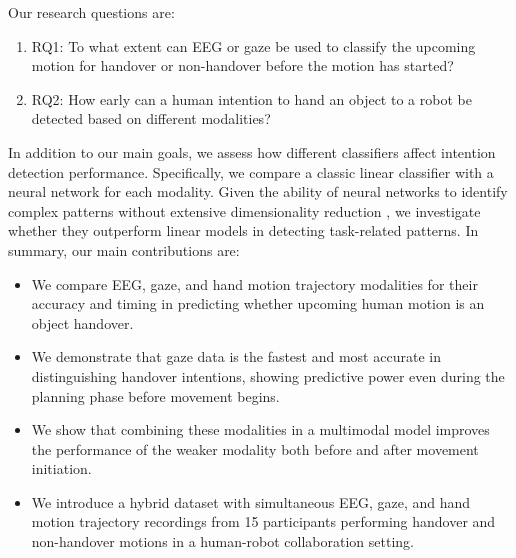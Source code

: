 Our research questions are:
\begin{enumerate}
    \item RQ1: To what extent can EEG or gaze be used to classify the upcoming motion for handover or non-handover before the motion has started? 
    \item RQ2: How early can a human intention to hand an object to a robot be detected based on different modalities?
\end{enumerate}
In addition to our main goals, we assess how different classifiers affect intention detection performance. Specifically, we compare a classic linear classifier with a neural network for each modality. Given the ability of neural networks to identify complex patterns without extensive dimensionality reduction \cite{wang2016action,rudenko2020human,craik2019deep,tang2017single,george2016real}, we investigate whether they outperform linear models in detecting task-related patterns. In summary, our main contributions are:
\begin{itemize}
    \item We compare EEG, gaze, and hand motion trajectory modalities for their accuracy and timing in predicting whether upcoming human motion is an object handover.
    \item We demonstrate that gaze data is the fastest and most accurate in distinguishing handover intentions, showing predictive power even during the planning phase before movement begins.
    \item We show that combining these modalities in a multimodal model improves the performance of the weaker modality both before and after movement initiation.
    \item We introduce a hybrid dataset with simultaneous EEG, gaze, and hand motion trajectory recordings from 15 participants performing handover and non-handover motions in a human-robot collaboration setting.
\end{itemize}

